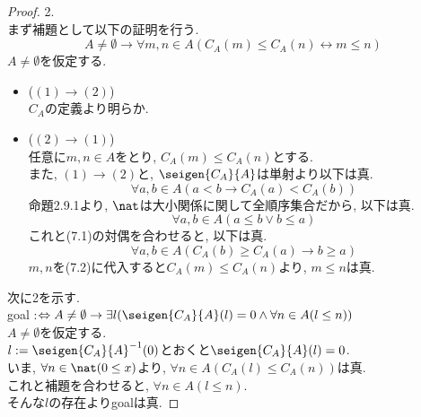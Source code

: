 \begin{proof} 2. \\
  まず補題として以下の証明を行う.
  \begin{equation*}
   A \neq \emptyset \rightarrow \forall m,n \in A(C_A(m) \leq C_A(n) \leftrightarrow m \leq n )
  \end{equation*}
  $A \neq \emptyset$を仮定する.\\
  \begin{itemize}
      \item[]\hspace{-0.5cm} ($(1) \rightarrow (2)$)\\
        $C_A$の定義より明らか.
      \item[]\hspace{-0.5cm} ($(2) \rightarrow (1)$)\\
        任意に$m,n \in A$をとり,
        $C_A(m) \leq C_A(n)$とする.\\
        また,
        $(1) \rightarrow (2)$と,
        $\seigen {C_A}{A}$は単射より以下は真.
          \begin{equation}
            \forall a,b \in A(a < b \rightarrow C_A(a) < C_A(b))
          \end{equation}
        命題2.9.1より,
        $\nat$は大小関係に関して全順序集合だから,
        以下は真.
        \begin{equation*}
          \forall a, b \in A (a \leq b \lor b \leq a )
        \end{equation*}
        これと(7.1)の対偶を合わせると,
        以下は真.
        \begin{equation}
            \forall a,b \in A(C_A(b) \geq C_A(a) \rightarrow b \geq a)
        \end{equation}
        $m,n$を(7.2)に代入すると$C_A(m) \leq C_A(n)$より,
        $m \leq n$は真.
  \end{itemize}
  次に2を示す.\\
  goal :$\Leftrightarrow A \neq \emptyset \rightarrow
  \exists l (\seigen{C_A}{A}(l) = 0 \land \forall n \in A(l \leq n))$\\
  $A \neq \emptyset$を仮定する.\\
  $l := \seigen{C_A}{A}^{-1}(0)$とおくと$\seigen{C_A}{A}(l) = 0$.\\
  いま,
  $\forall n \in \nat (0 \leq x)$より,
  $\forall n \in A (C_A(l) \leq C_A(n))$は真.\\
  これと補題を合わせると,
  $\forall n \in A (l \leq n)$.\\
  そんな$l$の存在よりgoalは真.
\end{proof}
